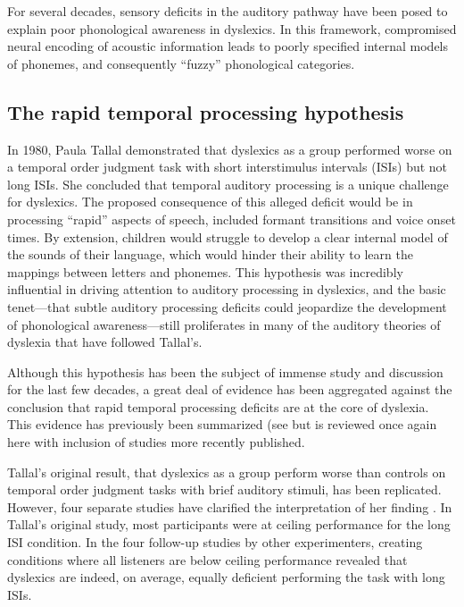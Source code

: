 \documentclass[../uwthesis.tex]{subfiles}
\begin{document}
For several decades, sensory deficits in the auditory pathway have been posed to explain poor
phonological awareness in dyslexics. In this framework, compromised neural encoding of acoustic
information leads to poorly specified internal models of phonemes, and consequently “fuzzy”
phonological categories. 

\subsection{The rapid temporal processing hypothesis}
In 1980, Paula Tallal demonstrated that dyslexics as a group performed worse on a temporal
order judgment task with short interstimulus intervals (ISIs) but not long ISIs\cite{Tallal1980AuditoryChildren}. She
concluded that temporal auditory processing is a unique challenge for dyslexics. The proposed
consequence of this alleged deficit would be in processing “rapid” aspects of speech, included formant
transitions and voice onset times. By extension, children would struggle to develop a clear internal
model of the sounds of their language, which would hinder their ability to learn the mappings
between letters and phonemes. This hypothesis was incredibly influential in driving attention to
auditory processing in dyslexics, and the basic tenet—that subtle auditory processing deficits could
jeopardize the development of phonological awareness—still proliferates in many of the auditory
theories of dyslexia that have followed Tallal’s.

Although this hypothesis has been the subject of immense study and discussion for the last
few decades, a great deal of evidence has been aggregated against the conclusion that rapid temporal
processing deficits are at the core of dyslexia. This evidence has previously been summarized (see \cite{Farmer1995TheReview,Rosen2003AuditoryAnything}but is reviewed once again here with inclusion of studies more recently published.

Tallal’s original result, that dyslexics as a group perform worse than controls on temporal
order judgment tasks with brief auditory stimuli, has been replicated. However, four separate studies
have clarified the interpretation of her finding
\cite{Reed1989SpeechChildren,Nittrouer1999DoProblems,Marshall2001RapidDyslexia,Waber2001ProcessingDisorders}.
In Tallal’s original study, most participants were at ceiling performance for the long ISI condition. In the four follow-up studies by other experimenters, creating
conditions where all listeners are below ceiling performance revealed that dyslexics are indeed, on
average, equally deficient performing the task with long ISIs.
\end{document}
